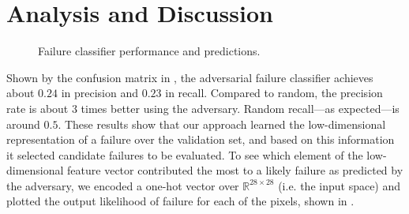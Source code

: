 \section{Analysis and Discussion}
\begin{figure}[ht]
    \centering
    \caption{Failure classifier performance and predictions.}
    \label{fig:prediction_results}
\end{figure}
Shown by the confusion matrix in , the adversarial failure classifier achieves about $0.24$ in precision and $0.23$ in recall.
Compared to random, the precision rate is about $3$ times better using the adversary. Random recall---as expected---is around $0.5$.
These results show that our approach learned the low-dimensional representation of a failure over the validation set, and based on this information it selected candidate failures to be evaluated.
To see which element of the low-dimensional feature vector contributed the most to a likely failure as predicted by the adversary, we encoded a one-hot vector over $\mathbb{R}^{28\times28}$ (i.e. the input space) and plotted the output likelihood of failure for each of the pixels, shown in .

%     

